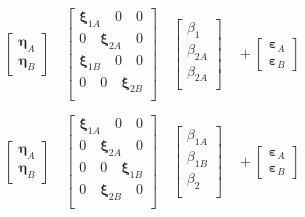 \[\label{nul2}
\left[\begin{array}{l}
\boldsymbol{\eta}_A \\
\boldsymbol{\eta}_B 
\end{array}\right] \quad
\left[\begin{array}{ccc}
\boldsymbol{\xi}_{1A}\quad 0 \quad0\\
0 \quad\boldsymbol{\xi}_{2A} \quad0\\
\boldsymbol{\xi}_{1B} \quad0 \quad0\\
0 \quad0 \quad\boldsymbol{\xi}_{2B}\\
\end{array}\right] \quad
\left[\begin{array}{l}
\beta_1 \\
\beta_{2A} \\
\beta_{2A} \\
\end{array}\right]  \quad +
\left[\begin{array}{l}
\boldsymbol{\varepsilon}_A \\
\boldsymbol{\varepsilon}_B 
\end{array}\right]\]

\[\label{nul22}
\left[\begin{array}{l}
\boldsymbol{\eta}_A \\
\boldsymbol{\eta}_B 
\end{array}\right] \quad
\left[\begin{array}{ccc}
\boldsymbol{\xi}_{1A}\quad 0 \quad0\\
0 \quad\boldsymbol{\xi}_{2A} \quad0\\
0 \quad0 \quad\boldsymbol{\xi}_{1B}\\
0 \quad\boldsymbol{\xi}_{2B} \quad0\\
\end{array}\right] \quad
\left[\begin{array}{l}
\beta_{1A} \\
\beta_{1B} \\
\beta_2 \\
\end{array}\right]  \quad +
\left[\begin{array}{l}
\boldsymbol{\varepsilon}_A \\
\boldsymbol{\varepsilon}_B 
\end{array}\right]\]

